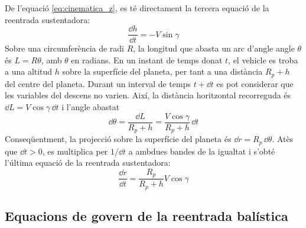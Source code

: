 De l'equació \eqref{eq:cinematica_z}, es té directament la tercera equació de la reentrada sustentadora:
\begin{equation} \label{eq:derivada_h_t_lifting}
    \frac{\dd h}{\dd t} = - V \sin{\gamma}
\end{equation}
Sobre una circumferència de radi $R$, la longitud que abasta un arc d'angle angle $\theta$ és $L = R \theta$, amb $\theta$ en radians. En un instant de temps donat $t$, el vehicle es troba a una altitud $h$ sobre la superfície del planeta, per tant a una distància $R_p + h$ del centre del planeta. Durant un interval de temps $t + \dd t$ es pot considerar que les variables del descens no varien. Així, la distància horitzontal recorreguda és $\dd L = V \cos{\gamma} \, \dd t$ i l'angle abastat
\begin{equation*}
    \dd \theta = \frac{\dd L}{R_p + h} = \frac{V \cos{\gamma}}{R_p + h} \, \dd t
\end{equation*}
Conseqüentment, la projecció sobre la superfície del planeta és $\dd r = R_p \, \dd \theta$. Atès que $\dd t > 0$, es multiplica per $1 / \dd t$ a ambdues bandes de la igualtat i s'obté l'última equació de la reentrada sustentadora:
\begin{equation} \label{eq:derivada_r_t_lifting}
    \frac{\dd r}{\dd t} = \frac{R_p}{R_p + h} V \cos{\gamma}
\end{equation}

\subsection{Equacions de govern de la reentrada balística}

